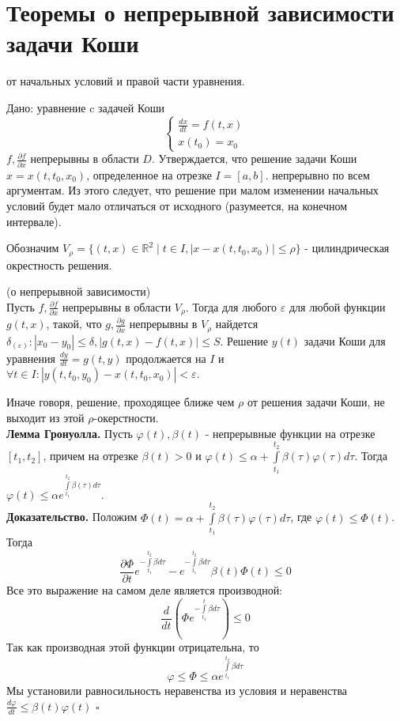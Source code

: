 \section{Теоремы о непрерывной зависимости задачи Коши}
от начальных условий и правой части уравнения.

Дано: уравнение c задачей Коши
$$\begin{cases}
    \frac{dx}{dt}=f(t,x)\\
    x(t_0)=x_0
\end{cases}$$ 
$f,\frac{\partial f}{\partial x}$  непрерывны в области $D$. 
Утверждается, что решение задачи Коши $x=x(t,t_0,x_0)$, определенное на 
отрезке $I=[a,b]$. 
непрерывно по всем 
аргументам. Из этого следует, что решение при малом изменении начальных 
условий будет мало отличаться от исходного (разумеется, на конечном
интервале). 

Обозначим $V_\rho=\{(t,x)\in \mathbb{R}^2\mid t\in I,|x-x(t,t_0,x_0)|
\leqslant \rho\}$ - цилиндрическая окрестность решения. 

\begin{theor}
    (о непрерывной зависимости)\\
    Пусть $f,\frac{\partial f}{\partial x}$  непрерывны в области $V_\rho$.
    Тогда для любого $\varepsilon$ для любой функции $g(t,x)$, такой, что
$g,\frac{\partial g}{\partial x}$ непрерывны в $V_\rho$ найдется
 $\delta_(\varepsilon):|x_0-y_0|\leqslant \delta,|g(t,x)-f(t,x)|\leqslant S$.
 Решение $y(t)$ задачи Коши для уравнения $\frac{dy}{dt}=g(t,y)$ продолжается
 на $I$ и  $\forall t\in I: |y(t,t_0,y_0)-x(t,t_0,x_0)|<\varepsilon$.
\end{theor}
Иначе говоря, решение, проходящее ближе чем $\rho$ от решения задачи Коши,
не выходит из этой $\rho$-окерстности.\\
\textbf{Лемма Гронуолла.} Пусть $\varphi(t),\beta(t)$ - непрерывные функции
на отрезке $[t_1,t_2]$, причем на отрезке $\beta(t)>0$ и  $\varphi(t)\leqslant 
\alpha+\int\limits_{t_1}^{t_2} \beta(\tau)\varphi(\tau)d\tau$. 
Тогда 
$\varphi(t)\leqslant \alpha e^{\int\limits_{t_1}^{t_2}\beta(\tau)d\tau}$.\\
\textbf{Доказательство.} Положим $\Phi(t)=\alpha+
\int\limits_{t_1}^{t_2} \beta(\tau)\varphi(\tau)d\tau$, где 
$\varphi(t)\leqslant \Phi(t)$. Тогда
$$\frac{\partial \Phi}{\partial t}e^{-\int\limits_{t_1}^{t_2}\beta d\tau}
-e^{-\int\limits_{t_1}^{t_2}\beta d\tau}\beta(t)\Phi(t)\leqslant 0$$ 
Все это выражение на самом деле является производной:
$$\frac{d}{dt}\left( \Phi e^{-\int\limits_{t_1}^{t}\beta d\tau} \right)
\leqslant 0$$ 
 Так как производная этой функции отрицательна, то 
$$\varphi \leqslant \Phi\leqslant \alpha
e^{\int\limits_{t_1}^{t_2}\beta d\tau}$$
Мы установили равносильность неравенства из условия и неравенства
$\frac{d\varphi}{dt}\leqslant \beta(t)\varphi(t)$ $\square$ 

